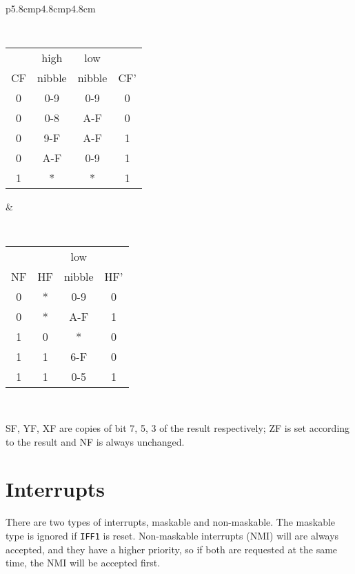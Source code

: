 {\begin{tabular}{p{5.8cm}p{4.8cm}p{4.8cm}}
		{\tt
			\begin{tabular}[t]{c|c|c|c}
				   & high   & low    & \\
				CF & nibble & nibble & CF' \\ 	
				\hline
				0 & 0-9    & 0-9    &  0  \\
				0 & 0-8    & A-F    &  0  \\
				0 & 9-F    & A-F    &  1  \\
				0 & A-F    & 0-9    &  1  \\
				1 &  *     &  *     &  1  \\ 
				\hline
			\end{tabular}
		}

		&
		
		{\tt
			\begin{tabular}[t]{c|c|c|c}
				   &    & low    & \\
				NF & HF & nibble & HF' \\ 
				\hline
				0 &  * & 0-9    &  0  \\
				0 &  * & A-F    &  1  \\
				1 &  0 &  *     &  0  \\
				1 &  1 & 6-F    &  0  \\
				1 &  1 & 0-5    &  1  \\ 
				\hline
			\end{tabular}
		}
		
		\\

	\end{tabular}
}

SF, YF, XF are copies of bit 7, 5, 3 of the result respectively; ZF is set according to the result and NF is always unchanged.


\section{Interrupts}
\label{z80_interrupts}

There are two types of interrupts, maskable and non-maskable. The maskable type is ignored if {\tt IFF1} is reset. Non-maskable interrupts (NMI) will are always accepted, and they have a higher priority, so if both are requested at the same time, the NMI will be accepted first.

